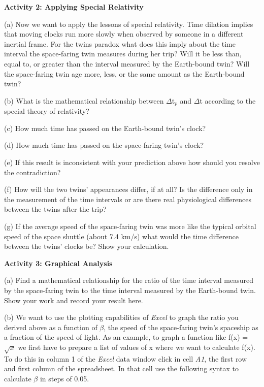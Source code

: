 \textbf{Activity 2: Applying Special Relativity}

(a) Now we want to apply the lessons of special relativity. Time dilation
implies that moving clocks run more slowly when observed by someone
in a different inertial frame. For the twins paradox what does this
imply about the time interval the space-faring twin measures during
her trip? Will it be less than, equal to, or greater than the interval
measured by the Earth-bound twin? Will the space-faring twin age more,
less, or the same amount as the Earth-bound twin?
\vspace{25mm}

(b) What is the mathematical relationship between \( \Delta  \)t\( _{p} \)
and \( \Delta  \)t according to the special theory of relativity?
\vspace{20mm}

(c) How much time has passed on the Earth-bound twin's clock?
\vspace{20mm}

(d) How much time has passed on the space-faring twin's clock?
\vspace{20mm}

(e) If this result is inconsistent with your prediction above how
should you resolve the contradiction?
\vspace{20mm}

(f) How will the two twins' appearances differ, if at all? Is the
difference only in the measurement of the time intervals or are there
real physiological differences between the twins after the trip?
\vspace{20mm}

(g) If the average speed of the space-faring twin was more like the
typical orbital speed of the space shuttle (about 7.4 km/s) what would
the time difference between the twins' clocks be? Show your calculation.
\vspace{45mm}

\textbf{Activity 3: Graphical Analysis}

(a) Find a mathematical relationship for the ratio of the time interval
measured by the space-faring twin to the time interval measured by
the Earth-bound twin. Show your work and record your result here.
\vspace{45mm}

(b) We want to use the plotting capabilities of \emph{Excel}
to graph the ratio you derived above as a function of \( \beta  \),
the speed of the space-faring twin's spaceship as a fraction of the
speed of light. As an example, to graph a function like f(x) = \( \sqrt{x} \)
we first have to prepare a list of values of x where we want to calculate
f(x). To do this in column 1 of the \emph{Excel} data window
click in cell {\it A1}, the first row and first column of the spreadsheet.
In that cell use the following syntax to calculate
\( \beta  \) in steps of 0.05.

